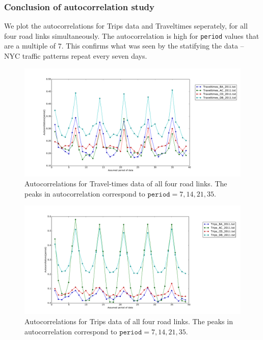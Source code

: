 \documentclass[10pt,a4paper]{amsart}
\begin{document}
\subsubsection{Conclusion of autocorrelation study}
We plot the autocorrelations for Trips data and Traveltimes seperately, for
all four road links simultaneously. The autocorrelation is high for
\texttt{period} values that are a multiple of \(7\). This confirms what was
seen by the statifying the data -- NYC traffic patterns repeat every seven
days.

\begin{figure}[h!]
\centering
\includegraphics[scale=0.35]{Figures/Autocorrelation_Traveltimes.pdf}
\caption{Autocorrelations for Travel-times data of all four road links. The
peaks in
autocorrelation correspond to \(\mathtt{period}=7,14,21,35\).}
\end{figure}

\begin{figure}[h!]
\centering
\includegraphics[scale=0.35]{Figures/Autocorrelation_Trips.pdf}
\caption{Autocorrelations for Trips data of all four road links. The peaks in
autocorrelation correspond to \(\mathtt{period}=7,14,21,35\).}
\end{figure}
\end{document}
